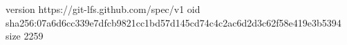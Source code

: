 version https://git-lfs.github.com/spec/v1
oid sha256:07a6d6cc339e7dfcb9821cc1bd57d145cd74c4c2ac6d2d3c62f58e419e3b5394
size 2259
